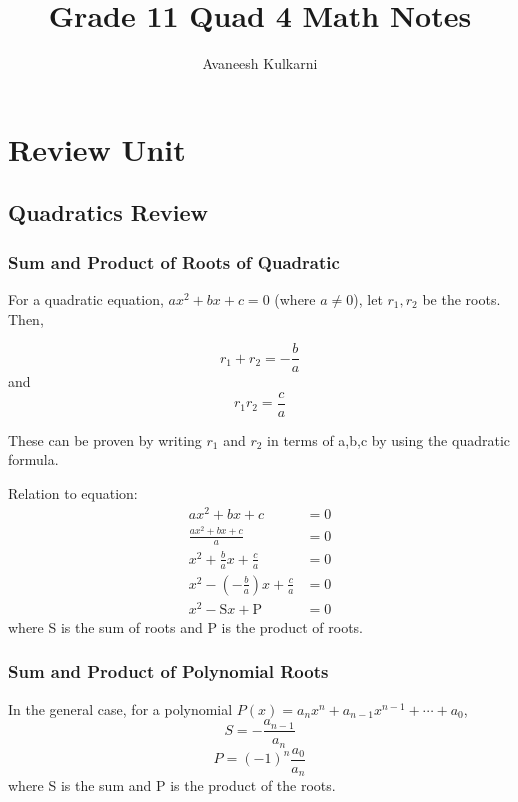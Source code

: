\documentclass{article}
\title{Grade 11 Quad 4 Math Notes}
\author{Avaneesh Kulkarni}
\date{}
\theoremstyle{definition}
\numberwithin{equation}{section}
\begin{document}
\maketitle
\tableofcontents
\newpage
{}

\section{Review Unit}

\subsection{Quadratics Review}

\subsubsection*{Sum and Product of Roots of Quadratic}
For a quadratic equation, $ax^2 + bx + c = 0$ (where $a \neq 0$),
let $r_1, r_2$ be the roots. Then,

\begin{equation}\label{sumquad}
	r_1 + r_2 = -\frac{b}{a}
\end{equation}
and
\begin{equation}\label{prodquad}
	r_1 r_2 = \frac{c}{a}
\end{equation}

These can be proven by writing $r_1$ and $r_2$ in terms of a,b,c by using the quadratic formula.

Relation to equation:
\begin{align*}
	ax^2 + bx + c &= 0 \\ 
	\frac{ax^2 + bx + c}{a} &= 0 \\ 
	x^2 + \frac{b}{a}x + \frac{c}{a} &= 0 \\ 
	x^2 - \left( - \frac{b}{a} \right) x + \frac{c}{a} &= 0 \\ 
	x^2 - \mathrm{S} x + \mathrm{P} &= 0 
\end{align*}
where S is the sum of roots and P is the product of roots.

\subsubsection*{Sum and Product of Polynomial Roots}
In the general case, for a polynomial $P(x) = a_nx^n + a_{n-1}x^{n-1} + \dotsb + a_0 $,
\begin{equation}
	S = - \frac{a_{n-1}}{a_n}
\end{equation}
\begin{equation}
	P = (-1)^n \frac{a_0}{a_n}
\end{equation}
where S is the sum and P is the product of the roots.
\end{document}
